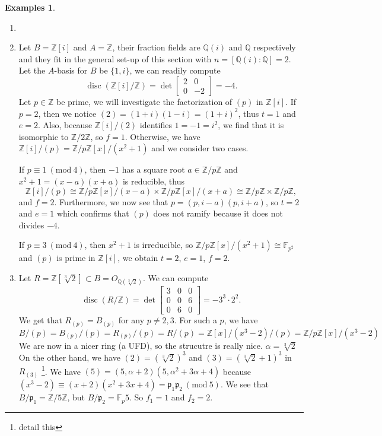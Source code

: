 \documentclass{tufte-handout} %
\theoremstyle{definition}
\newtheorem{exmps}[thm]{Examples}
\theoremstyle{remark}
\newcommand{\Mod}[1]{\ (\text{mod}\ #1)}
\newcommand{\Z}{\mathbb{Z}}
\newcommand{\Q}{\mathbb{Q}}
\newcommand{\F}{\mathbb{F}}
\newcommand{\lp}{{\mathfrak{p}}}
\DeclareMathOperator{\disc}{disc}
\begin{document}
\begin{exmps}
	\begin{enumerate}
		\item[]
		\item Let $B = \Z[i]$ and $A = \Z$, their fraction fields are $\Q(i)$ and $\Q$ respectively and they fit in the general set-up of this section with $n = [\Q(i): \Q] = 2$. Let the $A$-basis for $B$ be $\{1,i\}$, we can readily compute
		\[\disc(\Z[i]/\Z) = \det \begin{bmatrix}
		2&0\\0&-2
		\end{bmatrix} = -4.\]
		Let $p \in \Z$ be prime, we will investigate the factorization of $(p)$ in $\Z[i]$. If $p = 2$, then we notice $(2) = (1+i)(1-i) = (1+i)^2$, thus $t =1$ and $e = 2$. Also, because $\Z[i]/(2)$ identifies $1 = -1 = i^2$, we find that it is isomorphic to $\Z/2\Z$, so $f = 1$. Otherwise, we have
		$\Z[i]/(p) = \Z/p\Z[x]/(x^2+1)$ and we consider two cases.
		
		If $p \equiv 1 \Mod{4}$, then $-1$ has a square root $a \in \Z/p\Z$ and $x^2+1 = (x-a)(x+a)$ is reducible, thus \[\Z[i]/(p) \cong \Z/p\Z[x]/(x-a) \times \Z/p\Z[x]/(x+a) \cong \Z/p\Z \times \Z/p\Z,\]
		and $f = 2$. Furthermore, we now see that $p = (p,i-a)(p,i+a)$, so $t =2$ and $e = 1$ which confirms that $(p)$ does not ramify because it does not divides $-4$.
		
		If $p \equiv 3 \Mod{4}$, then $x^2+1$ is irreducible, so $\Z/p\Z[x]/(x^2+1) \cong \F_{p^2}$ and $(p)$ is prime in $\Z[i]$, we obtain $t=2$, $e=1$, $f=2$.
		\item Let $R = \Z[\sqrt[3]{2}] \subset B = O_{\Q(\sqrt[3]{2})}$. We can compute 
		\[\disc(R/\Z) = \det\begin{bmatrix}3&0&0\\0&0&6\\0&6&0\end{bmatrix} = -3^3\cdot 2^2.\]
		We get that $R_{(p)} = B_{(p)}$ for any $p \neq 2,3$. For such a $p$, we have
		\[B/(p) = B_{(p)}/(p) = R_{(p)}/(p) = R/(p) = \Z[x]/(x^3-2)/(p) = \Z/p\Z[x]/(x^3-2)\] We are now in a nicer ring (a UFD), so the strucutre is really nice. $\alpha = \sqrt[3]{2}$
		On the other hand, we have $(2) = (\sqrt[3]{2})^3$ and $(3) = (\sqrt[3]{2}+1)^3$ in $R_{(3)}$ \footnote{detail this}. We have $(5) = (5, \alpha + 2)(5, \alpha^2+3\alpha+4)$ because $(x^3-2) \equiv (x+2)(x^2+3x+4)  = \lp_1\lp_2 \Mod{5}$. We see that $B/\lp_1 = \Z/5\Z$, but $B/\lp_2 = \F_p{5}$. So $f_1 = 1$ and $f_2 = 2$.
		

\end{enumerate}
\end{exmps}
\end{document}
